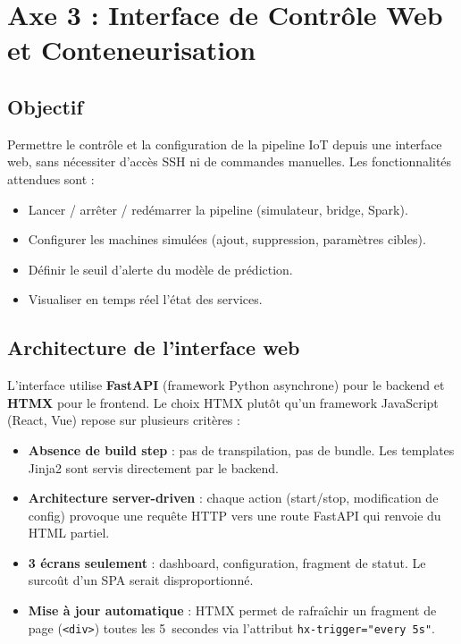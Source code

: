 \documentclass[12pt,a4paper]{article}
\begin{document}
\newpage

\section{Axe 3 : Interface de Contrôle Web et Conteneurisation}
\label{sec:web}

\subsection{Objectif}

Permettre le contrôle et la configuration de la pipeline IoT depuis une interface web, sans nécessiter d'accès SSH ni de commandes manuelles. Les fonctionnalités attendues sont :
\begin{itemize}
    \item Lancer / arrêter / redémarrer la pipeline (simulateur, bridge, Spark).
    \item Configurer les machines simulées (ajout, suppression, paramètres cibles).
    \item Définir le seuil d'alerte du modèle de prédiction.
    \item Visualiser en temps réel l'état des services.
\end{itemize}

\subsection{Architecture de l'interface web}

L'interface utilise \textbf{FastAPI} (framework Python asynchrone) pour le backend et \textbf{HTMX} pour le frontend. Le choix HTMX plutôt qu'un framework JavaScript (React, Vue) repose sur plusieurs critères :

\begin{itemize}
    \item \textbf{Absence de build step} : pas de transpilation, pas de bundle. Les templates Jinja2 sont servis directement par le backend.
    \item \textbf{Architecture server-driven} : chaque action (start/stop, modification de config) provoque une requête HTTP vers une route FastAPI qui renvoie du HTML partiel.
    \item \textbf{3 écrans seulement} : dashboard, configuration, fragment de statut. Le surcoût d'un SPA serait disproportionné.
    \item \textbf{Mise à jour automatique} : HTMX permet de rafraîchir un fragment de page (\texttt{<div>}) toutes les 5~secondes via l'attribut \texttt{hx-trigger="every 5s"}.
\end{itemize}
\end{document}
